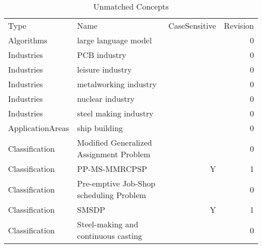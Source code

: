 {\scriptsize
\begin{longtable}{lp{10cm}rr}
\rowcolor{white}\caption{Unmatched Concepts}\\ \toprule
\rowcolor{white}Type & Name & CaseSensitive & Revision\\ \midrule
\endhead
\bottomrule
\endfoot
Algorithms & large language model &  & 0\\Industries & PCB industry &  & 0\\Industries & leisure industry &  & 0\\Industries & metalworking industry &  & 0\\Industries & nuclear industry &  & 0\\Industries & steel making industry &  & 0\\ApplicationAreas & ship building &  & 0\\Classification & Modified Generalized Assignment Problem &  & 0\\Classification & PP-MS-MMRCPSP & Y & 1\\Classification & Pre-emptive Job-Shop scheduling Problem &  & 0\\Classification & SMSDP & Y & 1\\Classification & Steel-making and continuous casting &  & 0\\\end{longtable}
}

